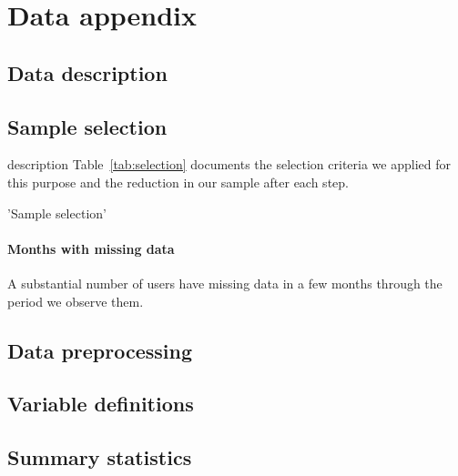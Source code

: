 
\section{Data appendix}
\label{sec:data_appendix}

\subsection{Data description}
\label{sub:data_description}


\subsection{Sample selection}
\label{sub:sample_selection}
description
Table~\ref{tab:selection} documents the selection criteria we applied for this purpose and the reduction in our sample after each step.

\begin{table}[h]
\caption{'Sample selection'}\label{tab:selection}

\end{table}


\paragraph{Months with missing data}
A substantial number of users have missing data in a few months through the period we observe them.

\subsection{Data preprocessing}
\label{sub:data_preprocessing}


\subsection{Variable definitions}
\label{sub:variable_definitions}


\subsection{Summary statistics}
\label{sub:summary_statistics}


